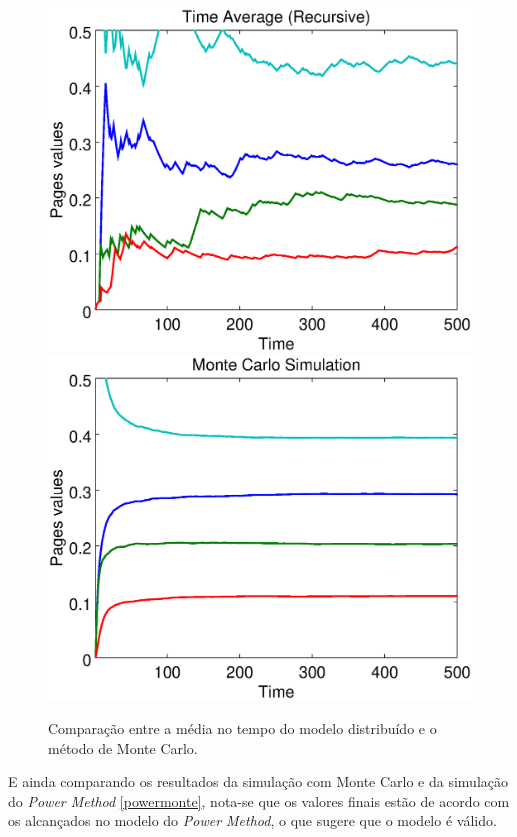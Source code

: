 \
\begin{figure}[!htb]
	\centering
	\includegraphics[scale=0.35]{imagens/timerecursive}
	\hspace{0.1cm}
	\includegraphics[scale=0.35]{imagens/montecarlo}
	\caption{Comparação entre a média no tempo do modelo distribuído e o método de Monte Carlo.}
	\label{timemonte}
\end{figure}

E ainda comparando os resultados da simulação com Monte Carlo e da simulação do \textit{Power Method} \ref{powermonte}, nota-se que os valores finais estão de acordo com os alcançados no modelo do \textit{Power Method}, o que sugere que o modelo é válido.

